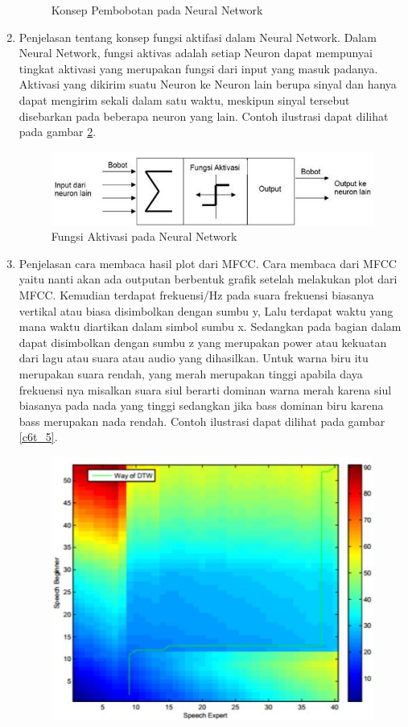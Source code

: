 \begin{enumerate}
\begin{figure}[!htbp]
\caption{Konsep Pembobotan pada Neural Network}
\label{c6t_3}
\end{figure} 
\item Penjelasan tentang konsep fungsi aktifasi dalam Neural Network.
\subitem Dalam Neural Network, fungsi aktivas adalah setiap Neuron dapat mempunyai tingkat aktivasi yang merupakan fungsi dari input yang masuk padanya. Aktivasi yang dikirim suatu Neuron ke Neuron lain berupa sinyal dan hanya dapat mengirim sekali dalam satu waktu, meskipun sinyal tersebut disebarkan pada beberapa neuron yang lain. Contoh ilustrasi dapat dilihat pada gambar \ref{c6t_4}.
\begin{figure}[!htbp]
\centerline{\includegraphics[width=1\textwidth]{figures/c6t/4.JPG}}
\caption{Fungsi Aktivasi pada Neural Network}
\label{c6t_4}
\end{figure} 
\item Penjelasan cara membaca hasil plot dari MFCC.
\subitem Cara membaca dari MFCC yaitu nanti akan ada outputan berbentuk grafik setelah melakukan plot dari MFCC. Kemudian terdapat frekuensi/Hz pada suara frekuensi biasanya vertikal atau biasa disimbolkan dengan sumbu y, Lalu terdapat waktu yang mana waktu diartikan dalam simbol sumbu x. Sedangkan pada bagian dalam dapat disimbolkan dengan sumbu z yang merupakan power atau kekuatan dari lagu atau suara atau audio yang dihasilkan. Untuk warna biru itu merupakan suara rendah, yang merah merupakan tinggi apabila daya frekuensi nya misalkan suara siul berarti dominan warna merah karena siul biasanya pada nada yang tinggi sedangkan jika bass dominan biru karena bass merupakan nada rendah. Contoh ilustrasi dapat dilihat pada gambar \ref{c6t_5}.
\begin{figure}[!htbp]
\centerline{\includegraphics[width=1\textwidth]{figures/c6t/5.JPG}}

\end{figure}
\end{enumerate}
